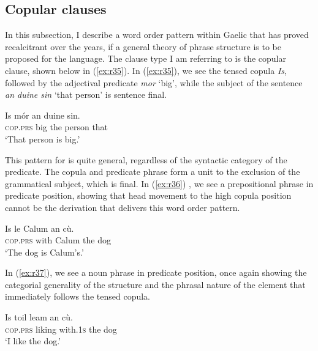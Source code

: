 \documentclass[output=paper,colorlinks,citecolor=brown]{langscibook}
\begin{document}
\subsection{Copular clauses}

In this subsection, I describe a word order pattern within  Gaelic that has proved recalcitrant over the years, if a general theory of phrase structure is to be proposed for the language.  The clause type I am referring to is the copular clause, shown below in (\ref{ex:r35}). In (\ref{ex:r35}), we see the tensed copula \textit{Is}, followed by the adjectival predicate \textit{mor} `big', while the subject of the sentence \textit{an duine sin} `that person'  is sentence final.

\ea\label{ex:r35}
\gll Is m\'{o}r an duine sin.\\
\textsc{cop.}\textsc{prs} big the person that \\
\glt `That person is big.'
\z

This pattern for  is quite general, regardless of the syntactic category of the predicate. The copula and predicate phrase form a unit to the exclusion of the grammatical subject, which is final. In (\ref{ex:r36}) , we see a prepositional phrase in predicate position, showing that head movement to the high copula position cannot be the derivation that delivers this word order pattern. 

\ea\label{ex:r36}
\gll Is le Calum an c\`{u}.\\
\textsc{cop.}\textsc{prs} with Calum the dog \\
\glt `The dog is Calum's.'
\z

In (\ref{ex:r37}), we see a noun phrase in predicate position, once again showing the categorial generality of the structure and the phrasal nature of the element that immediately follows the tensed copula. 

\ea\label{ex:r37}
\gll Is toil leam an c\`{u}. \\
\textsc{cop.}\textsc{prs} liking with.1\textsc{s} the dog \\
\glt `I like the dog.'
\z

\end{document}

